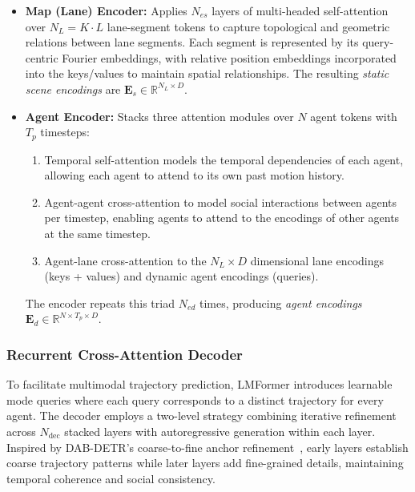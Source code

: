 \begin{itemize}[leftmargin=*]
    \item \textbf{Map (Lane) Encoder:}
        Applies \(N_{es}\) layers of multi-headed self-attention over \(N_L = K \cdot L\) lane-segment tokens to capture  topological and geometric relations between lane segments. Each segment is represented by its query-centric Fourier embeddings, with relative position embeddings incorporated into the keys/values to maintain spatial relationships. The resulting \emph{static scene encodings} are \(\mathbf{E}_s \in \mathbb{R}^{N_L \times D}\).
  \item \textbf{Agent Encoder:}
        Stacks three attention modules over \(N\) agent tokens with \(T_{p}\) timesteps:
        \begin{enumerate}
          \item Temporal self-attention models the temporal dependencies of each agent, allowing each agent to attend to its own past motion history.
          \item Agent-agent cross-attention to model social interactions between agents per timestep, enabling agents to attend to the encodings of other agents at the same timestep.
          \item Agent-lane cross-attention to the \(N_L \times D \) dimensional lane encodings (keys + values) and dynamic agent encodings (queries).
        \end{enumerate}
        The encoder repeats this triad \(N_{ed}\) times, producing \emph{agent encodings} \(\mathbf{E}_d \in \mathbb{R}^{N \times T_{p} \times D}\).
\end{itemize}

\subsubsection*{Recurrent Cross-Attention Decoder}

To facilitate multimodal trajectory prediction, LMFormer introduces learnable mode queries where each query corresponds to a distinct trajectory for every agent. The decoder employs a two-level strategy combining iterative refinement across \(N_{\text{dec}}\) stacked layers with autoregressive generation within each layer. Inspired by DAB-DETR's coarse-to-fine anchor refinement~\cite{liu2022dabdetr}, early layers establish coarse trajectory patterns while later layers add fine-grained details, maintaining temporal coherence and social consistency.

